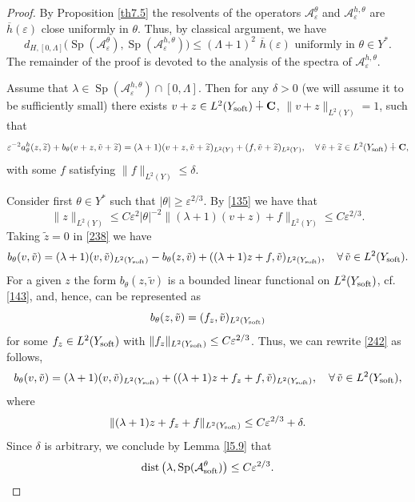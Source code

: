 \documentclass[11pt]{article}
\newcommand\e {\varepsilon}
\newcommand\soft{{\rm soft}}
\def\C{\mathbf {C}}
\def\AA{\mathcal{A}}
\def\l{\lambda}
\DeclareMathOperator{\Sp}{Sp}
\newcommand\dist{\operatorname{dist}}
\theoremstyle{remark}
\begin{document}
\begin{proof}
	By Proposition \ref{th7.5} the resolvents of the operators   $\AA_\e^\theta$ and $\AA_\e^{h,\theta}$ are $\overline{h}(\e)$ close uniformly in $\theta$. Thus, by classical argument, we have
	\begin{equation*}%
		d_{H, [0, \Lambda]}\Big( \Sp (\AA_\e^\theta), \Sp (\AA_\e^{h,\theta}) \Big) \leq  (\Lambda+1)^2\,\,\overline{h}(\e) \mbox{ uniformly in } \theta\in  Y^*.
	\end{equation*}
		The remainder of the proof is devoted to the analysis of the spectra of  $\AA_\e^{h,\theta}$.
	\medskip

	Assume that $\l\in \Sp (\AA_\e^{h,\theta})\cap [0, \Lambda]$. Then for any $\delta >0$ (we will assume it to be sufficiently small) there exists $v + z \in L^2(Y_\soft) \dotplus \C$, $\|v + z \|_{L^2(Y)}=1$, such that
 	\begin{equation}\label{238}
		\e^{-2} a_\theta^h(z, \widetilde z) + b_\theta(v + z, \tilde v+ \widetilde z) =  (\l +1)(v + z,\tilde v + \widetilde z)_{L^2(Y)} + (f,\tilde v  + \widetilde z)_{L^2(Y)}, \quad \forall\, \tilde v+\widetilde z \in L^2(Y_\soft) \dotplus \C,
	\end{equation}
  with some $f$ satisfying  $\| f\|_{L^2(Y)}\leq \delta$.
	
	Consider first $\theta\in  Y^*$ such that $|\theta |\geq \e^{2/3}$. By \eqref{135} we have that
	\begin{equation*}
		\| z\|_{L^2(Y)} \leq C 	\e^{2} |\theta|^{-2} \|(\l+1)(v + z) + f\|_{L^2(Y)} \leq  C \e^{2/3}.
	\end{equation*}
	Taking $\widetilde z =0$ in \eqref{238} we have
	\begin{equation}\label{242}
		b_\theta(v , \tilde v)  =  (\l +1)(v ,\tilde v )_{L^2(Y_\soft)} - b_\theta( z, \tilde v) +  ((\l+1) z + f,\tilde v )_{L^2(Y_\soft)}, \quad \forall\, \tilde v \in L^2(Y_\soft) .
	\end{equation}
	For a given $z$ the form $b_\theta( z, \tilde v)$ is a bounded linear functional on $L^2(Y_\soft)$, cf. \eqref{143}, and, hence, can be represented as
	\begin{equation*}
		b_\theta( z, \tilde v) =  (f_z,\tilde v )_{L^2(Y_\soft)}
	\end{equation*}
	for some $f_z\in L^2(Y_\soft)$ with $\|f_z \|_{L^2(Y_\soft)}\leq C  \e^{2/3}$. Thus, we can rewrite \eqref{242} as follows,
	\begin{equation*}%
		b_\theta(v , \tilde v)  =  (\l +1)(v ,\tilde v )_{L^2(Y_\soft)}  + ((\l+1) z + f_z+ f,\tilde v )_{L^2(Y_\soft)}, \quad \forall\, \tilde v \in L^2(Y_\soft),
	\end{equation*}
	where
	\begin{equation*}
		\|(\l+1) z + f_z+ f\|_{L^2(Y_\soft)} \leq C \e^{2/3} + \delta.
	\end{equation*}
	Since $\delta$ is arbitrary, we conclude by Lemma \ref{l5.9} that
	\begin{equation}\label{243}
		\dist \big( \l , \Sp(\AA_\soft^\theta)\big)  \leq C \e^{2/3}.
	\end{equation}
	

\end{proof}
\end{document}
